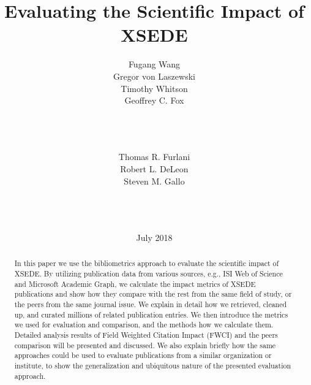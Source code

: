 \documentclass{sig-alternate}
\newcommand{\TITLE}{Evaluating the Scientific Impact of XSEDE}
\begin{document}

\title{\TITLE\vspace{-12pt}}

\author{ 
\alignauthor 
Fugang Wang\\ \vspace{2pt}
Gregor von Laszewski\\ \vspace{2pt}
Timothy Whitson\\ \vspace{2pt}
Geoffrey C. Fox\\ \vspace{6pt}
       \\ 
       \\ 
       \\ 
\and
\alignauthor  
Thomas R. Furlani\\ \vspace{2pt}
Robert L. DeLeon\\ \vspace{2pt}
Steven M. Gallo\\ \vspace{6pt}
       \\
       \\ 
       \\ 
}

\date{July 2018}

\maketitle

\begin{abstract}

In this paper we use the bibliometrics approach to evaluate the scientific impact of XSEDE.
By utilizing publication data from various sources, e.g., ISI Web of Science and
Microsoft Academic Graph, we calculate the impact metrics of XSEDE publications
and show how they compare with the rest from the same field of study, or the peers
from the same journal issue. We explain in detail how we retrieved, cleaned up,
and curated millions of related publication entries.
We then introduce the metrics we used for evaluation and comparison, and the methods
how we calculate them. Detailed analysis results of Field Weighted Citation Impact (FWCI)
and the peers comparison will be presented and discussed. We also explain briefly how the same
approaches could be used to evaluate publications from a similar organization or
institute, to show the generalization and ubiquitous nature of the presented
evaluation approach.


\end{abstract}
\end{document}
